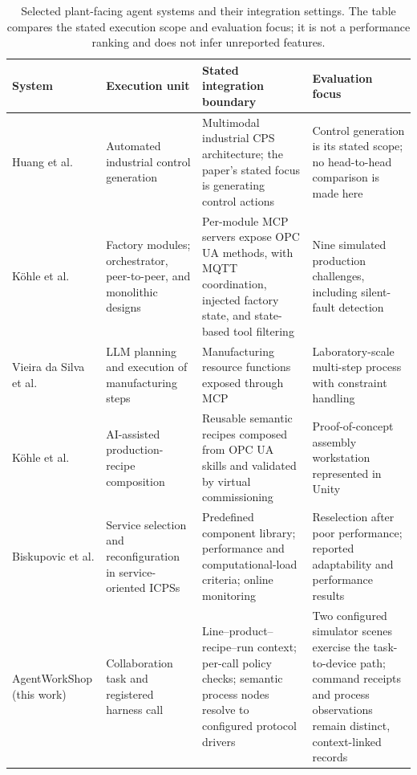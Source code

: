 \begin{table}[!t]
\centering
\caption{Selected plant-facing agent systems and their integration settings.
The table compares the stated execution scope and evaluation focus; it is not
a performance ranking and does not infer unreported features.}
\label{tab:nearest}
\small
\setlength{\tabcolsep}{4pt}
\begin{tabularx}{\textwidth}{@{}p{2.3cm}p{2.5cm}XX@{}}
\toprule
System & Execution unit & Stated integration boundary & Evaluation focus \\
\midrule
Huang et al. \cite{huang2026made} & Automated industrial control generation & Multimodal industrial CPS architecture; the paper's stated focus is generating control actions & Control generation is its stated scope; no head-to-head comparison is made here \\
K{\"o}hle et al. \cite{koehle2026llmdriven} & Factory modules; orchestrator, peer-to-peer, and monolithic designs & Per-module MCP servers expose OPC UA methods, with MQTT coordination, injected factory state, and state-based tool filtering & Nine simulated production challenges, including silent-fault detection \\
Vieira da Silva et al. \cite{silva2025mcpmanufacturing} & LLM planning and execution of manufacturing steps & Manufacturing resource functions exposed through MCP & Laboratory-scale multi-step process with constraint handling \\
K{\"o}hle et al. \cite{koehle2025semanticrecipes} & AI-assisted production-recipe composition & Reusable semantic recipes composed from OPC UA skills and validated by virtual commissioning & Proof-of-concept assembly workstation represented in Unity \\
Biskupovic et al. \cite{biskupovic2025supervision} & Service selection and reconfiguration in service-oriented ICPSs & Predefined component library; performance and computational-load criteria; online monitoring & Reselection after poor performance; reported adaptability and performance results \\
\midrule
AgentWorkShop (this work) & Collaboration task and registered harness call & Line--product--recipe--run context; per-call policy checks; semantic process nodes resolve to configured protocol drivers & Two configured simulator scenes exercise the task-to-device path; command receipts and process observations remain distinct, context-linked records \\
\bottomrule
\end{tabularx}
\end{table}

